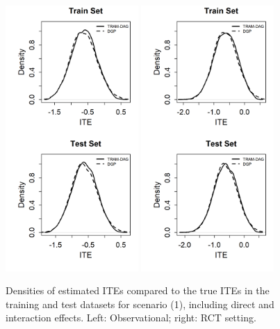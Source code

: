 \begin{figure}[htbp]
\centering
\includegraphics[width=0.45\textwidth]{img/results/observ_scenario1_ITE_densities_train_test.png}
\includegraphics[width=0.45\textwidth]{img/results/rct_scenario1_ITE_densities_train_test.png}
\caption{Densities of estimated ITEs compared to the true ITEs in the training and test datasets for scenario (1), including direct and interaction effects. Left: Observational; right: RCT setting.}
\label{fig:scenario1_ite_densities_train_test}
\end{figure}






